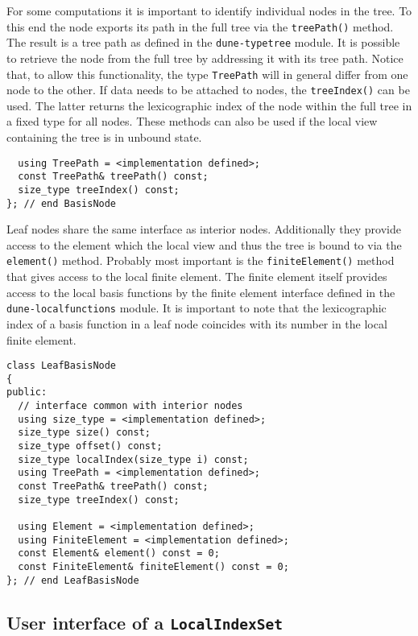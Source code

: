 \documentclass[a4paper,10pt,headings=normal,bibliography=totoc]{scrartcl}
\newcommand{\cpp}[1]{\lstinline[basicstyle=\ttfamily]!#1!}
\newcommand{\dunemodule}[1]{\texttt{#1}}
\begin{document}
For some computations it is important to identify
individual nodes in the tree. To this end the node
exports its path in the full tree via the \cpp{treePath()}
method. The result is a tree path
as defined in the \dunemodule{dune-typetree} module.
It is possible to retrieve the node from the full
tree by addressing it with its tree path.
Notice that, to allow this functionality, the
type \cpp{TreePath} will in general differ from one node to the other.
If data needs to be attached to nodes,
the \cpp{treeIndex()} can be used. The latter returns
the lexicographic index of the node within the full
tree in a fixed type for all nodes.
These methods can also be used if the local view containing
the tree is in unbound state.

\begin{lstlisting}
  using TreePath = <implementation defined>;
  const TreePath& treePath() const;
  size_type treeIndex() const;
}; // end BasisNode
\end{lstlisting}

Leaf nodes share the same interface as interior
nodes. Additionally they provide access to the
element which the local view and thus the tree is bound
to via the \cpp{element()} method. Probably most important
is the \cpp{finiteElement()} method that gives access
to the local finite element. The finite element
itself provides access to the local basis functions
by the finite element interface defined in the
\dunemodule{dune-localfunctions} module.
It is important to note that the lexicographic
index of a basis function in a leaf node coincides
with its number in the local finite element.

\begin{lstlisting}
class LeafBasisNode
{
public:
  // interface common with interior nodes
  using size_type = <implementation defined>;
  size_type size() const;
  size_type offset() const;
  size_type localIndex(size_type i) const;
  using TreePath = <implementation defined>;
  const TreePath& treePath() const;
  size_type treeIndex() const;

  using Element = <implementation defined>;
  using FiniteElement = <implementation defined>;
  const Element& element() const = 0;
  const FiniteElement& finiteElement() const = 0;
}; // end LeafBasisNode
\end{lstlisting}



\subsection{User interface of a \cpp{LocalIndexSet}}
\label{sec:localindexset_interface}
\end{document}
